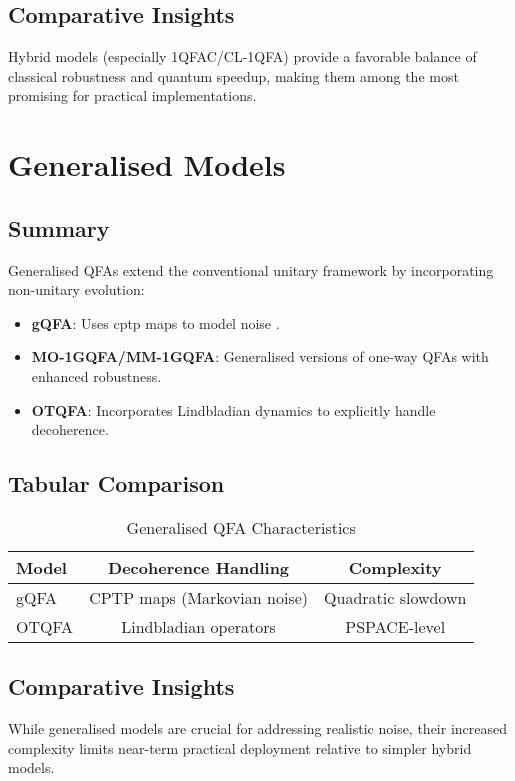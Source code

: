\subsection{Comparative Insights}
Hybrid models (especially 1QFAC/CL-1QFA) provide a favorable balance of classical robustness and quantum speedup, making them among the most promising for practical implementations.

\section{Generalised Models}

\subsection{Summary}
Generalised QFAs extend the conventional unitary framework by incorporating non-unitary evolution:
\begin{itemize}
    \item \textbf{gQFA}: Uses \gls{cptp} maps to model noise \cite{gruska2005}.
    \item \textbf{MO-1GQFA/MM-1GQFA}: Generalised versions of one-way QFAs with enhanced robustness.
    \item \textbf{OTQFA}: Incorporates Lindbladian dynamics to explicitly handle decoherence.
\end{itemize}

\subsection{Tabular Comparison}
\begin{table}[ht]
\centering
\caption{Generalised QFA Characteristics}
\label{tab:general}
\begin{tabular}{|l|c|c|}
\hline
\textbf{Model} & \textbf{Decoherence Handling} & \textbf{Complexity} \\ \hline
gQFA   & CPTP maps (Markovian noise) & Quadratic slowdown \\ \hline
OTQFA & Lindbladian operators & PSPACE-level \\ \hline
\end{tabular}
\end{table}

\subsection{Comparative Insights}
While generalised models are crucial for addressing realistic noise, their increased complexity limits near-term practical deployment relative to simpler hybrid models.

